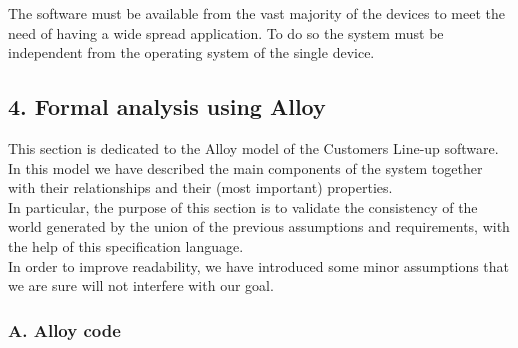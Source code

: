 \documentclass[
]{article}
\begin{document}
The software must be available from the vast majority of the devices to
meet the need of having a wide spread application. To do so the system
must be independent from the operating system of the single device.

\hypertarget{formal-analysis-using-alloy}{%
\subsection{4. Formal analysis using
Alloy}\label{formal-analysis-using-alloy}}

This section is dedicated to the Alloy model of the Customers Line-up
software. In this model we have described the main components of the
system together with their relationships and their (most important)
properties.\\
In particular, the purpose of this section is to validate the
consistency of the world generated by the union of the previous
assumptions and requirements, with the help of this specification
language.\\
In order to improve readability, we have introduced some minor
assumptions that we are sure will not interfere with our goal.

\hypertarget{a.-alloy-code}{%
\subsubsection{A. Alloy code}\label{a.-alloy-code}}
\end{document}
